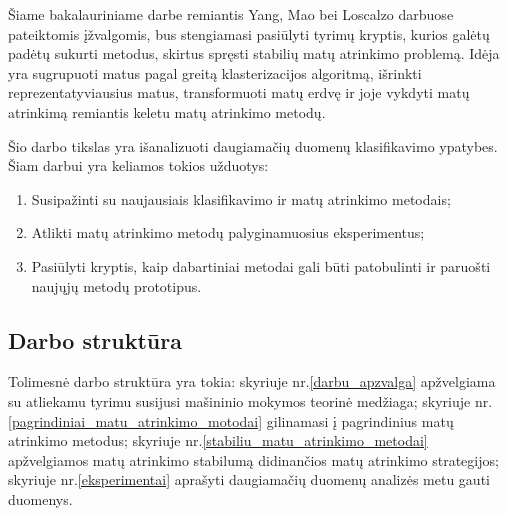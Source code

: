 Šiame bakalauriniame darbe remiantis Yang, Mao bei Loscalzo darbuose pateiktomis įžvalgomis, bus stengiamasi pasiūlyti tyrimų kryptis, kurios galėtų padėtų sukurti metodus, skirtus spręsti stabilių matų atrinkimo problemą. Idėja yra sugrupuoti matus pagal greitą klasterizacijos algoritmą, išrinkti reprezentatyviausius matus, transformuoti matų erdvę ir joje vykdyti matų atrinkimą remiantis keletu matų atrinkimo metodų.

Šio darbo tikslas yra išanalizuoti daugiamačių duomenų klasifikavimo ypatybes. Šiam darbui yra keliamos tokios užduotys:
\begin{enumerate}
 \item Susipažinti su naujausiais klasifikavimo ir matų atrinkimo metodais;
 \item Atlikti matų atrinkimo metodų palyginamuosius eksperimentus;
 \item Pasiūlyti kryptis, kaip dabartiniai metodai gali būti patobulinti ir paruošti naujųjų metodų prototipus.
\end{enumerate}

\subsection*{Darbo struktūra}

Tolimesnė darbo struktūra yra tokia: skyriuje nr.\ref{darbu_apzvalga} apžvelgiama su atliekamu tyrimu susijusi mašininio mokymos teorinė medžiaga; skyriuje nr.\ref{pagrindiniai_matu_atrinkimo_motodai} gilinamasi į pagrindinius matų atrinkimo metodus; skyriuje nr.\ref{stabiliu_matu_atrinkimo_metodai} apžvelgiamos matų atrinkimo stabilumą didinančios matų atrinkimo strategijos; skyriuje nr.\ref{eksperimentai} aprašyti daugiamačių duomenų analizės metu gauti duomenys.

